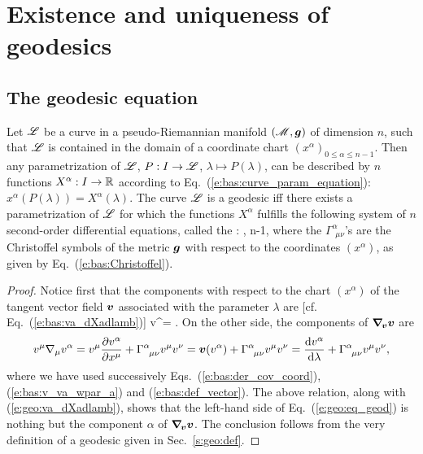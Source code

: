 
\section{Existence and uniqueness of geodesics}

\subsection{The geodesic equation} \label{s:geo:geodesic_eq}

\begin{prop}
Let $\mathscr{L}$ be a curve in a pseudo-Riemannian
manifold $(\mathscr{M},\bm{g})$ of dimension $n$, such that
$\mathscr{L}$ is contained in the domain of a coordinate chart $(x^\alpha)_{0\leq\alpha\leq n-1}$.
Then any parametrization of $\mathscr{L}$, $P: I \to  \mathscr{L}$, $\lambda\mapsto P(\lambda)$,
can be described by $n$ functions $X^\alpha: I\to \mathbb{R}$
according to Eq.~(\ref{e:bas:curve_param_equation}): $x^\alpha(P(\lambda)) = X^\alpha(\lambda)$.
The curve $\mathscr{L}$ is a geodesic iff there exists a parametrization of $\mathscr{L}$
for which the functions $X^\alpha$ fulfills the following
system of $n$ second-order differential equations, called the
:
\be \label{e:geo:eq_geod}
    ,   \leq \alpha \leq n-1,
\ee
where the $\Gamma^\alpha_{\ \, \mu \nu}$'s are the Christoffel symbols of the metric $\bm{g}$
with respect to the coordinates $(x^\alpha)$, as given by Eq.~(\ref{e:bas:Christoffel}).
\end{prop}
\begin{proof}
Notice first that the components with respect
to the chart $(x^\alpha)$ of the tangent
vector field $\bm{v}$ associated with the parameter $\lambda$ are [cf. Eq.~(\ref{e:bas:va_dXadlamb})]
\be \label{e:geo:va_dXadlamb}
    v^\alpha =  .
\ee
On the other side, the components of $\bm{\nabla}_{\!\bm{v}}\bm{v}$ are
\[
    v^\mu \nabla_\mu v^\alpha = v^\mu \frac{\partial v^\alpha}{\partial x^\mu} + \Gamma^\alpha_{\ \, \mu \nu} v^\mu v^\nu
    = \bm{v}(v^\alpha) + \Gamma^\alpha_{\ \, \mu \nu} v^\mu v^\nu
    = \frac{\mathrm{d} v^\alpha}{\mathrm{d} \lambda} + \Gamma^\alpha_{\ \, \mu \nu} v^\mu v^\nu ,
\]
where we have used
successively Eqs.~(\ref{e:bas:der_cov_coord}), (\ref{e:bas:v_va_wpar_a}) and
(\ref{e:bas:def_vector}). The above relation, along with (\ref{e:geo:va_dXadlamb}),
shows that the left-hand side of
Eq.~(\ref{e:geo:eq_geod}) is nothing but the component $\alpha$ of
$\bm{\nabla}_{\!\bm{v}}\bm{v}$. The conclusion follows from the very definition
of a geodesic given in Sec.~\ref{s:geo:def}.
\end{proof}

